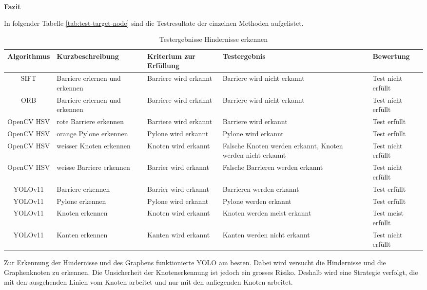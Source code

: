\textbf{Fazit}

In folgender Tabelle \ref{tab:test-target-node} sind die Testresultate der einzelnen Methoden aufgelistet.


\begin{table}[H]
\centering
\small
\begin{tabularx}{\textwidth}{|c|X|X|X|l|}
        \hline
        \textbf{Algorithmus} & \textbf{Kurzbeschreibung} & \textbf{Kriterium zur Erfüllung} & \textbf{Testergebnis} & \textbf{Bewertung} \\
        \hline \hline
        SIFT & Barriere erlernen und erkennen & Barriere wird erkannt & Barriere wird nicht erkannt & Test nicht erfüllt \\ \hline \hline
        ORB & Barriere erlernen und erkennen & Barriere wird erkannt & Barriere wird nicht erkannt & Test nicht erfüllt \\ \hline \hline
        OpenCV HSV & rote Barriere erkennen & Barriere wird erkannt & Barriere wird erkannt & Test erfüllt \\ \hline
        OpenCV HSV & orange Pylone erkennen & Pylone wird erkannt & Pylone wird erkannt & Test erfüllt \\ \hline
        OpenCV HSV & weisser Knoten erkennen & Knoten wird erkannt & Falsche Knoten werden erkannt, Knoten werden nicht erkannt & Test nicht erfüllt \\ \hline
        OpenCV HSV & weisse Barriere erkennen & Barrier wird erkannt & Falsche Barrieren werden erkannt & Test nicht erfüllt \\ \hline \hline
        YOLOv11 & Barriere erkennen & Barrier wird erkannt & Barrieren werden erkannt & Test erfüllt \\ \hline
        YOLOv11 & Pylone erkennen & Pylone wird erkannt & Pylone werden erkannt & Test erfüllt \\ \hline
        YOLOv11 & Knoten erkennen & Knoten wird erkannt & Knoten werden meist erkannt & Test meist erfüllt \\ \hline
        YOLOv11 & Kanten erkennen & Kanten wird erkannt & Kanten werden nicht erkannt & Test nicht erfüllt \\ \hline

\end{tabularx}
    \caption{Testergebnisse Hindernisse erkennen}
\label{tab:test-obst-detection}
\end{table}

Zur Erkennung der Hindernisse und des Graphens funktionierte YOLO am besten. Dabei wird versucht die Hindernisse und die Graphenknoten zu erkennen. Die Unsicherheit der Knotenerkennung ist jedoch ein grosses Risiko. Deshalb wird eine Strategie verfolgt, die mit den ausgehenden Linien vom Knoten arbeitet und nur mit den anliegenden Knoten arbeitet.


